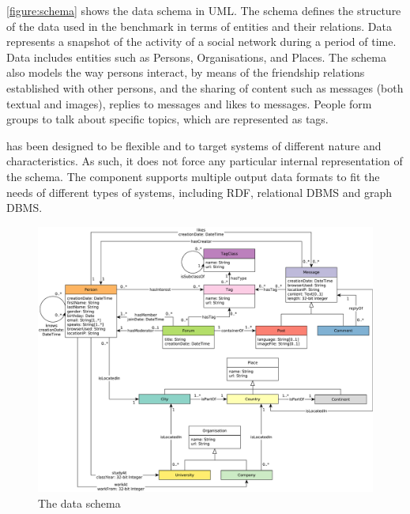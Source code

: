 \autoref{figure:schema} shows the data schema in UML. The schema defines the
structure of the data used in the benchmark in terms of entities and their
relations. Data represents a snapshot of the activity of a social network
during a period of time. Data includes entities such as Persons, Organisations,
and Places. The schema also models the way persons interact, by means of the
friendship relations established with other persons, and the sharing of content
such as messages (both textual and images), replies to messages and likes to
messages.  People form groups to talk about specific topics, which are
represented as tags.

\ldbcsnb has been designed to be flexible and to target systems of different
nature and characteristics. As such, it does not force any particular internal
representation of the schema. The \datagen component
supports multiple output data formats to
fit the needs of different types of systems, including RDF, relational DBMS and
graph DBMS.


\begin{figure}[htbp]
	\centering
	\includegraphics[width=\linewidth]{figures/schema}
	\caption{The \ldbcsnb data schema}
	\label{figure:schema}
\end{figure}

